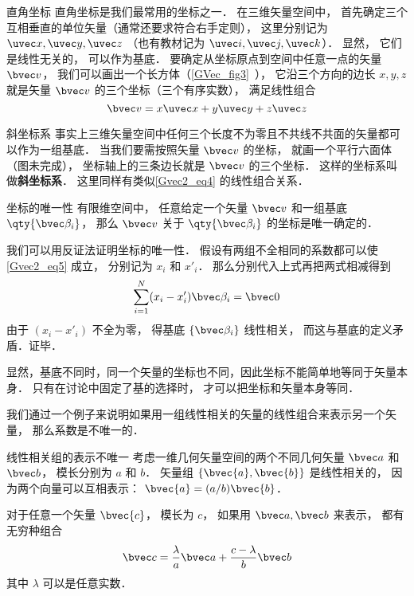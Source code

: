 \begin{example}{直角坐标}
直角坐标是我们最常用的坐标之一． 在三维矢量空间中， 首先确定三个互相垂直的单位矢量（通常还要求符合右手定则）， 这里分别记为 $\uvec x, \uvec y, \uvec z$ （也有教材记为 $\uvec i, \uvec j, \uvec k$）． 显然， 它们是线性无关的， 可以作为基底． 要确定从坐标原点到空间中任意一点的矢量 $\bvec v$， 我们可以画出一个长方体（\autoref{GVec_fig3}~）， 它沿三个方向的边长 $x, y, z$ 就是矢量 $\bvec v$ 的三个坐标（三个有序实数）， 满足线性组合
\begin{equation}\label{Gvec2_eq4}
\bvec v = x\uvec x + y\uvec y + z\uvec z
\end{equation}
\end{example}

\begin{example}{斜坐标系}
事实上三维矢量空间中任何三个长度不为零且不共线不共面的矢量都可以作为一组基底． 当我们要需按照矢量 $\bvec v$ 的坐标， 就画一个平行六面体（图未完成）， 坐标轴上的三条边长就是 $\bvec v$ 的三个坐标． 这样的坐标系叫做\textbf{斜坐标系}． 这里同样有类似\autoref{Gvec2_eq4} 的线性组合关系．
\end{example}

\begin{theorem}{坐标的唯一性}
有限维空间中， 任意给定一个矢量 $\bvec v$ 和一组基底 $\qty{\bvec \beta_i}$， 那么 $\bvec v$ 关于 $\qty{\bvec \beta_i}$ 的坐标是唯一确定的．
\end{theorem}
我们可以用反证法证明坐标的唯一性． 假设有两组不全相同的系数都可以使\autoref{Gvec2_eq5} 成立， 分别记为 $x_i$ 和 $x'_i$． 那么分别代入上式再把两式相减得到
\begin{equation}
\sum_{i=1}^N (x_i-x'_i) \bvec \beta_i = \bvec 0
\end{equation}
由于 $(x_i-x'_i)$ 不全为零， 得基底 $\{\bvec \beta_i\}$ 线性相关， 而这与基底的定义矛盾．证毕．

显然，基底不同时，同一个矢量的坐标也不同，因此坐标不能简单地等同于矢量本身． 只有在讨论中固定了基的选择时， 才可以把坐标和矢量本身等同．

我们通过一个例子来说明如果用一组线性相关的矢量的线性组合来表示另一个矢量， 那么系数是不唯一的．

\begin{example}{线性相关组的表示不唯一}
考虑一维几何矢量空间的两个不同几何矢量 $\bvec a$ 和 $\bvec b$， 模长分别为 $a$ 和 $b$． 矢量组 $\{\bvec{a}, \bvec{b}\}$ 是线性相关的， 因为两个向量可以互相表示： $\bvec{a}=(a/b)\bvec{b}$．

对于任意一个矢量 $\bvec{c}$， 模长为 $c$， 如果用 $\bvec a, \bvec b$ 来表示， 都有无穷种组合
\begin{equation}
\bvec c = \frac{\lambda}{a} \bvec a + \frac{c - \lambda}{b} \bvec b
\end{equation}
其中 $\lambda$ 可以是任意实数．
\end{example}

